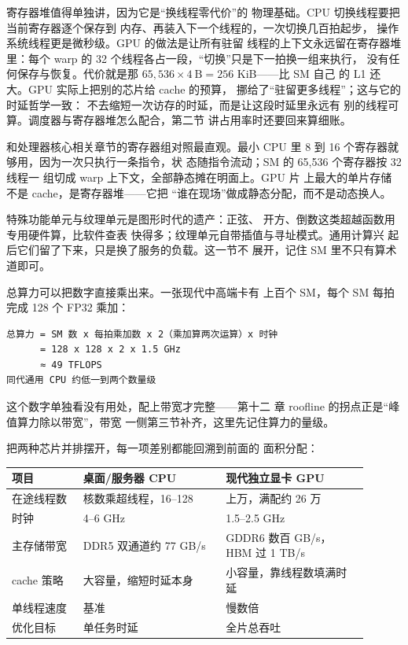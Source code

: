 寄存器堆值得单独讲，因为它是“换线程零代价”的
物理基础。CPU 切换线程要把当前寄存器逐个保存到
内存、再装入下一个线程的，一次切换几百拍起步，
操作系统线程更是微秒级。GPU 的做法是让所有驻留
线程的上下文永远留在寄存器堆里：每个 warp 的 32
个线程各占一段，“切换”只是下一拍换一组来执行，
没有任何保存与恢复。代价就是那
$65,536\times4\ \text{B}=256$ KiB——比 SM 自己
的 L1 还大。GPU 实际上把别的芯片给 cache 的预算，
挪给了“驻留更多线程”；这与它的时延哲学一致：
不去缩短一次访存的时延，而是让这段时延里永远有
别的线程可算。调度器与寄存器堆怎么配合，第二节
讲占用率时还要回来算细账。

和处理器核心相关章节的寄存器组对照最直观。最小 CPU 里 8 到
16 个寄存器就够用，因为一次只执行一条指令，状
态随指令流动；SM 的 65,536 个寄存器按 32 线程一
组切成 warp 上下文，全部静态摊在明面上。GPU 片
上最大的单片存储不是 cache，是寄存器堆——它把
“谁在现场”做成静态分配，而不是动态换人。

特殊功能单元与纹理单元是图形时代的遗产：正弦、
开方、倒数这类超越函数用专用硬件算，比软件查表
快得多；纹理单元自带插值与寻址模式。通用计算兴
起后它们留了下来，只是换了服务的负载。这一节不
展开，记住 SM 里不只有算术道即可。

总算力可以把数字直接乘出来。一张现代中高端卡有
上百个 SM，每个 SM 每拍完成 128 个 FP32 乘加：

\begin{lstlisting}
总算力 = SM 数 x 每拍乘加数 x 2（乘加算两次运算）x 时钟
      = 128 x 128 x 2 x 1.5 GHz
      ≈ 49 TFLOPS
同代通用 CPU 约低一到两个数量级
\end{lstlisting}

这个数字单独看没有用处，配上带宽才完整——第十二
章 roofline 的拐点正是“峰值算力除以带宽”，带宽
一侧第三节补齐，这里先记住算力的量级。

把两种芯片并排摆开，每一项差别都能回溯到前面的
面积分配：

\begin{longtable}{L{0.18\linewidth}L{0.36\linewidth}L{0.36\linewidth}}
\toprule
项目 & 桌面/服务器 CPU & 现代独立显卡 GPU \\
\midrule
在途线程数 & 核数乘超线程，16--128 & 上万，满配约 26 万 \\\tablerowrule
时钟 & 4--6 GHz & 1.5--2.5 GHz \\\tablerowrule
主存储带宽 & DDR5 双通道约 77 GB/s & GDDR6 数百 GB/s，HBM 过 1 TB/s \\\tablerowrule
cache 策略 & 大容量，缩短时延本身 & 小容量，靠线程数填满时延 \\\tablerowrule
单线程速度 & 基准 & 慢数倍 \\\tablerowrule
优化目标 & 单任务时延 & 全片总吞吐 \\
\bottomrule
\end{longtable}

